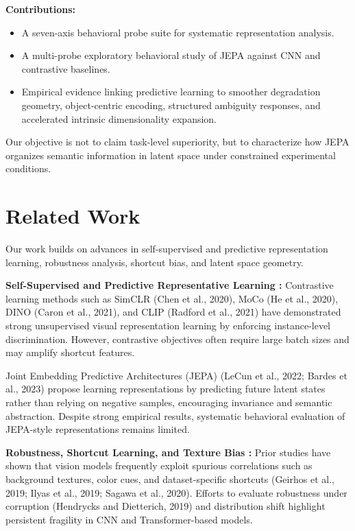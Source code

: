 \documentclass[10pt,twocolumn]{article}
\begin{document}
\textbf{Contributions:}
\begin{itemize}
\item A seven-axis behavioral probe suite for systematic representation analysis.
\item A multi-probe exploratory behavioral study of JEPA against CNN and contrastive baselines.
\item Empirical evidence linking predictive learning to smoother degradation geometry, object-centric encoding, structured ambiguity responses, and accelerated intrinsic dimensionality expansion.
\end{itemize}

Our objective is not to claim task-level superiority, but to characterize how JEPA organizes semantic information in latent space under constrained experimental conditions.

\section{Related Work}
Our work builds on advances in self-supervised and predictive representation learning, robustness analysis, shortcut bias, and latent space geometry.

\textbf{Self-Supervised and Predictive Representative Learning :}
Contrastive learning methods such as SimCLR (Chen et al., 2020), MoCo (He et al., 2020), DINO (Caron et al., 2021), and CLIP (Radford et al., 2021) have demonstrated strong unsupervised visual representation learning by enforcing instance-level discrimination. However, contrastive objectives often require large batch sizes and may amplify shortcut features.

Joint Embedding Predictive Architectures (JEPA) (LeCun et al., 2022; Bardes et al., 2023) propose learning representations by predicting future latent states rather than relying on negative samples, encouraging invariance and semantic abstraction. Despite strong empirical results, systematic behavioral evaluation of JEPA-style representations remains limited.

\textbf{Robustness, Shortcut Learning, and Texture Bias :}
Prior studies have shown that vision models frequently exploit spurious correlations such as background textures, color cues, and dataset-specific shortcuts (Geirhos et al., 2019; Ilyas et al., 2019; Sagawa et al., 2020). Efforts to evaluate robustness under corruption (Hendrycks and Dietterich, 2019) and distribution shift highlight persistent fragility in CNN and Transformer-based models.
\end{document}
